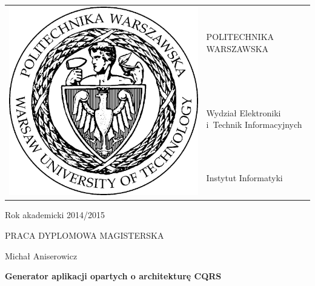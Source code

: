 \begin{titlepage}

 \begin{tabular}{ll}
  \multirow{3}{*}{\includegraphics[scale=0.3]{figures/pw.jpg}} & POLITECHNIKA WARSZAWSKA                      \\
                                                               & Wydział Elektroniki i~Technik Informacyjnych \\
                                                               & Instytut Informatyki
 \end{tabular}
 
 \begin{flushright}
  Rok akademicki 2014/2015
 \end{flushright}

 \vspace{2cm}
 
 \begin{center}
  \LARGE PRACA DYPLOMOWA MAGISTERSKA
  
  \vspace{2cm}
  
  \large Michał Aniserowicz
  
  \vspace{2cm}
  
  \textbf{Generator aplikacji opartych o architekturę CQRS}
 \end{center}
 

\end{titlepage}
